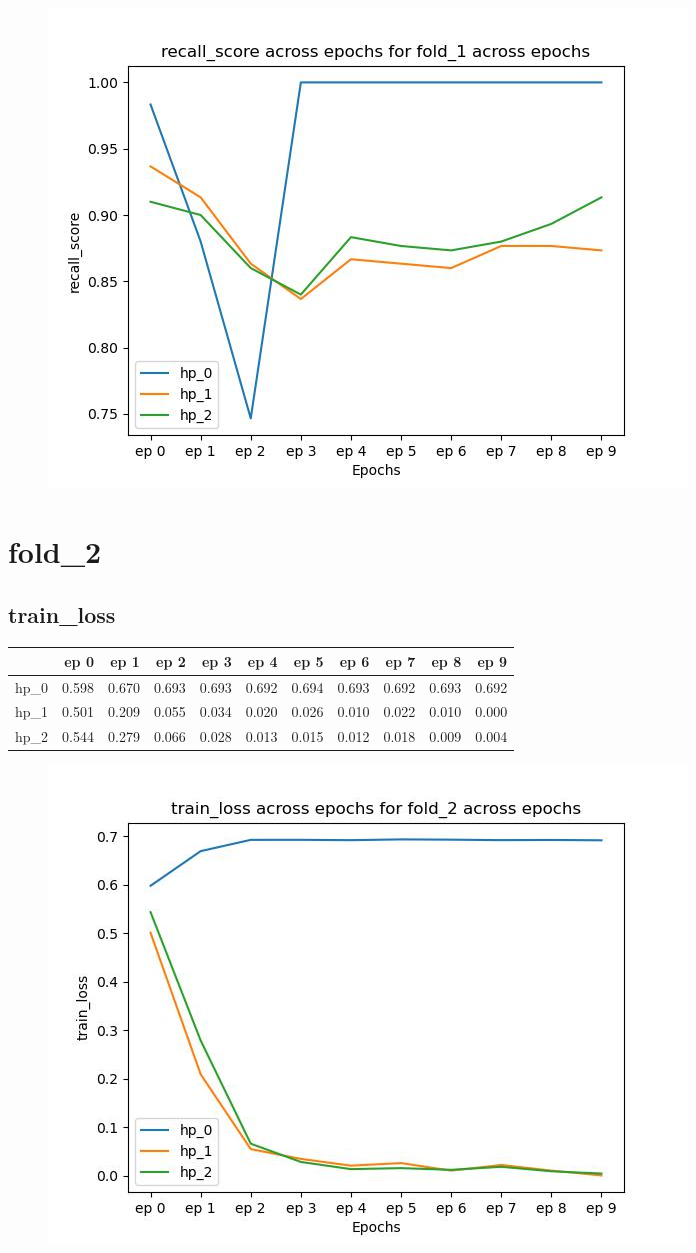 \documentclass{article}
\begin{document}
\begin{figure}[H]
\includegraphics[scale = 0.75]{fold_1/recall_score}
\end{figure}
\section{fold\_2}
\subsection{train\_loss}
\begin{tabular}{lrrrrrrrrrr}
\toprule
{} &   ep 0 &   ep 1 &   ep 2 &   ep 3 &   ep 4 &   ep 5 &   ep 6 &   ep 7 &   ep 8 &   ep 9 \\
\midrule
hp\_0 &  0.598 &  0.670 &  0.693 &  0.693 &  0.692 &  0.694 &  0.693 &  0.692 &  0.693 &  0.692 \\
hp\_1 &  0.501 &  0.209 &  0.055 &  0.034 &  0.020 &  0.026 &  0.010 &  0.022 &  0.010 &  0.000 \\
hp\_2 &  0.544 &  0.279 &  0.066 &  0.028 &  0.013 &  0.015 &  0.012 &  0.018 &  0.009 &  0.004 \\
\bottomrule
\end{tabular}

\begin{figure}[H]
\includegraphics[scale = 0.75]{fold_2/train_loss}
\end{figure}
\end{document}
